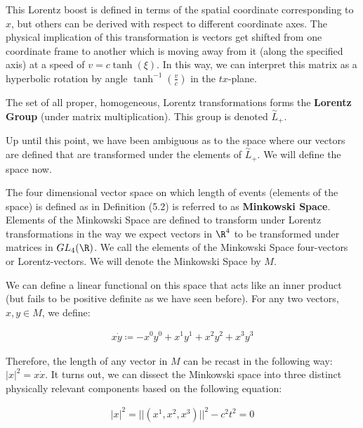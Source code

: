 This Lorentz boost is defined in terms of the spatial coordinate corresponding to $x$, but others can be derived with respect to different coordinate axes. The physical implication of this transformation is vectors get shifted from one coordinate frame to another which is moving away from it (along the specified axis) at a speed of $v=c\tanh(\xi)$. In this way, we can interpret this matrix as a hyperbolic rotation by angle $\tanh^{-1}(\frac{v}{c})$ in the $tx$-plane.

\begin{definition}
	The set of all proper, homogeneous, Lorentz transformations forms the \textbf{Lorentz Group} (under matrix multiplication). This group is denoted $\overset{\sim}{L}_+$.
\end{definition}

Up until this point, we have been ambiguous as to the space where our vectors are defined that are transformed under the elements of $\overset{\sim}{L}_+$. We will define the space now.

\begin{definition}
	The four dimensional vector space on which length of events (elements of the space) is defined as in Definition (5.2) is referred to as \textbf{Minkowski Space}. Elements of the Minkowski Space are defined to transform under Lorentz transformations in the way we expect vectors in $\R^4$ to be transformed under matrices in $GL_4(\R)$. We call the elements of the Minkowski Space four-vectors or Lorentz-vectors. We will denote the Minkowski Space by $M$.
\end{definition}


We can define a linear functional on this space that acts like an inner product (but fails to be positive definite as we have seen before). For any two vectors, $x,y\in M$, we define:

\begin{equation}
\begin{aligned}
	x\dot y \coloneq -x^0y^0 + x^1y^1 + x^2y^2 + x^3y^3
\end{aligned}
\end{equation}


Therefore, the length of any vector in $M$ can be recast in the following way: $|x|^2 = x\dot x$. It turns out, we can dissect the Minkowski space into three distinct physically relevant components based on the following equation:

\begin{equation}
\begin{aligned}
	|x|^2 = ||(x^1,x^2,x^3)||^2 - c^2t^2= 0 
\end{aligned}
\end{equation}

